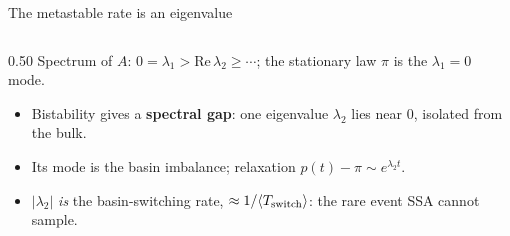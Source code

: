 \documentclass[10pt,aspectratio=169]{beamer}
\begin{document}
\begin{frame}{The metastable rate is an eigenvalue}

  \begin{columns}[T]
    \begin{column}{0.50\textwidth}
      Spectrum of $A$: $0=\lambda_1>\mathrm{Re}\,\lambda_2\ge\cdots$; the stationary
      law $\pi$ is the $\lambda_1{=}0$ mode.
      \begin{itemize}\setlength\itemsep{0.35em}
        \item Bistability gives a \textbf{spectral gap}: one eigenvalue $\lambda_2$
              lies near $0$, isolated from the bulk.
        \item Its mode is the basin imbalance; relaxation
              $p(t)-\pi\sim e^{\lambda_2 t}$.
        \item $|\lambda_2|$ \emph{is} the basin-switching rate,
              $\approx 1/\langle T_{\rm switch}\rangle$: the rare event SSA cannot
              sample.
      \end{itemize}


\end{column}
\end{columns}
\end{frame}
\end{document}
